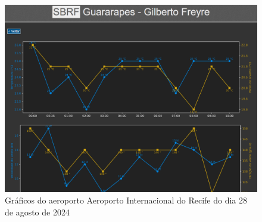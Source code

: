 \begin{figure}[ht]
    \begin{center}
    \includegraphics[width=400pt]{img/plots-SBRF.png}
    \caption{Gráficos do aeroporto Aeroporto Internacional do Recife do dia 28 de agosto de 2024}
    \label{fig:sbrf-plot}
    \end{center}
\end{figure}
